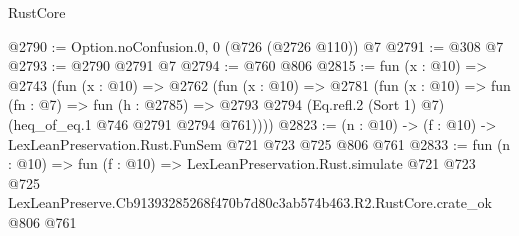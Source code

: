 \begin{lexlean}{RustCore}
\begin{coremodule}
@2790 := Option.noConfusion.{0, 0} (@726 (@2726 @110)) @7
@2791 := @308 @7
@2793 := @2790 @2791 @7
@2794 := @760 @806
@2815 := fun (x : @10) =>
  @2743
    (fun (x : @10) =>
    @2762
      (fun (x : @10) =>
      @2781
        (fun (x : @10) =>
        fun (fn : @7) =>
        fun (h : @2785) =>
        @2793 @2794 (Eq.refl.{2} (Sort 1) @7) (heq_of_eq.{1} @746 @2791 @2794 @761))))
@2823 := (n : @10) -> (f : @10) -> LexLeanPreservation.Rust.FunSem @721 @723 @725 @806 @761
@2833 := fun (n : @10) =>
  fun (f : @10) =>
  LexLeanPreservation.Rust.simulate
    @721
    @723
    @725
    LexLeanPreserve.Cb91393285268f470b7d80c3ab574b463.R2.RustCore.crate_ok
    @806
    @761
\end{coremodule}
\end{lexlean}

